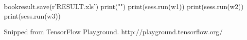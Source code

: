 \documentclass{article}
\begin{document}
\begin{spacing}{2}
\begin{python}
    bookresult.save(r'RESULT.xls')
    print("\n")
    print(sess.run(w1))
    print(sess.run(w2))
    print(sess.run(w3))

\end{python}
   

    
    
    \begin{thebibliography}{10}
    Snipped from TensorFlow Playground. http://playground.tensorflow.org/


    \end{thebibliography}

    \end{spacing}
    
\end{document}
